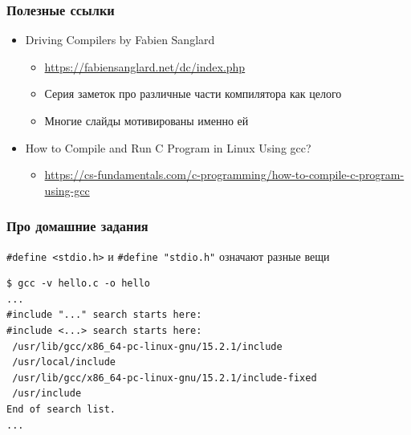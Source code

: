 \documentclass[aspectratio=169]{beamer}
\begin{document}
\begin{frame}
    \frametitle{Полезные ссылки}

    \begin{itemize}
        \item Driving Compilers by Fabien Sanglard
              \begin{itemize}
                  \item \url{https://fabiensanglard.net/dc/index.php}
                  \item Серия заметок про различные части компилятора как целого
                  \item Многие слайды мотивированы именно ей
              \end{itemize}
        \item How to Compile and Run C Program in Linux Using gcc?
              \begin{itemize}
                  \item \url{https://cs-fundamentals.com/c-programming/how-to-compile-c-program-using-gcc}
              \end{itemize}
    \end{itemize}

\end{frame}

\appendix

\begin{frame}[fragile]
    \frametitle{Про домашние задания}

    \texttt{\#define <stdio.h>} и \texttt{\#define "stdio.h"} означают разные вещи

    \vspace{1em}

    \begin{verbatim}
$ gcc -v hello.c -o hello
...
#include "..." search starts here:
#include <...> search starts here:
 /usr/lib/gcc/x86_64-pc-linux-gnu/15.2.1/include
 /usr/local/include
 /usr/lib/gcc/x86_64-pc-linux-gnu/15.2.1/include-fixed
 /usr/include
End of search list.
...
    \end{verbatim}
\end{frame}
\end{document}

